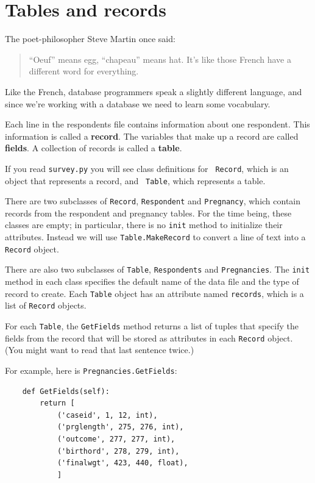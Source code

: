 \documentclass[12pt]{book}
\begin{document}
\section{Tables and records}

The poet-philosopher Steve Martin once said:

\begin{quote}
``Oeuf'' means egg, ``chapeau'' means hat.  It's like those French
  have a different word for everything.
\end{quote}

Like the French, database programmers speak a slightly
different language, and since we're working with a database we need
to learn some vocabulary.

Each line in the respondents file contains information about one
respondent.  This information is called a {\bf record}.  The
variables that make up a record are called {\bf fields}.  A
collection of records is called a {\bf table}.

If you read {\tt survey.py} you will see class definitions for {\tt
  Record}, which is an object that represents a record, and {\tt
  Table}, which represents a table.

There are two subclasses of
{\tt Record}, {\tt Respondent} and {\tt Pregnancy}, which
contain records from the respondent and pregnancy tables.
For the time being, these classes are empty; in particular, there
is no {\tt init} method to initialize their attributes.  Instead
we will use {\tt Table.MakeRecord} to convert a line of text into
a {\tt Record} object.

There are also two subclasses of {\tt Table}, {\tt Respondents}
and {\tt Pregnancies}.  The {\tt init} method in each class
specifies the default name of the data file and the type of
record to create.  Each {\tt Table} object has an attribute
named {\tt records}, which is a list of {\tt Record} objects.

For each {\tt Table}, the {\tt GetFields} method returns
a list of tuples that specify the fields from the record that
will be stored as attributes in each {\tt Record} object.  (You
might want to read that last sentence twice.)

For example, here is {\tt Pregnancies.GetFields}:

\begin{verbatim}
    def GetFields(self):
        return [
            ('caseid', 1, 12, int),
            ('prglength', 275, 276, int),
            ('outcome', 277, 277, int),
            ('birthord', 278, 279, int),
            ('finalwgt', 423, 440, float),
            ]
\end{verbatim}
\end{document}
